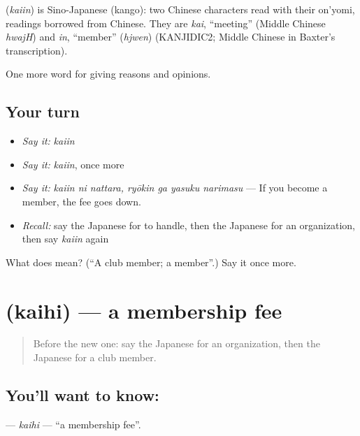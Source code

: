 \begin{cousinweb}
\textbf{} (\emph{kaiin}) is Sino-Japanese (kango): two Chinese characters read with their on'yomi, readings borrowed from Chinese. They are \emph{kai}, \textquotedblleft{}meeting\textquotedblright{} (Middle Chinese \emph{hwajH}) and \emph{in}, \textquotedblleft{}member\textquotedblright{} (\emph{hjwen}) (KANJIDIC2; Middle Chinese in Baxter's transcription).
\end{cousinweb}

\begin{grammarlens}[title={What you've built}]
One more word for giving reasons and opinions.
\end{grammarlens}

\subsection*{Your turn}
\begin{itemize}
\raggedright
  \item \emph{Say it:} \emph{kaiin}
  \item \emph{Say it:} \emph{kaiin}, once more
  \item \emph{Say it:} \emph{kaiin ni nattara, ryōkin ga yasuku narimasu} — If you become a member, the fee goes down.
  \item \emph{Recall:} say the Japanese for to handle, then the Japanese for an organization, then say \emph{kaiin} again
\end{itemize}

\begin{tcolorbox}[breakable,colback=teal!4,colframe=teal!35!black,title={Before you move on}]
What does  mean? (\textquotedblleft{}A club member; a member\textquotedblright{}.) Say it once more.
\end{tcolorbox}
\section[\texorpdfstring{\ja{かいひ} (kaihi)}{かいひ (kaihi)}]{ (kaihi) — a membership fee}

\label{lesson:JA-C335-kaihi}



\begin{quote}
Before the new one: say the Japanese for an organization, then the Japanese for a club member.
\end{quote}

\subsection*{You'll want to know: }
\textbf{} — \emph{kaihi} — \textquotedblleft{}a membership fee\textquotedblright{}.

